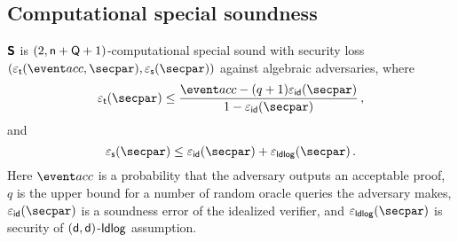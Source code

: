 \subsection{Computational special soundness}
\begin{lemma}
	\label{lem:sonicprot_ss}
	$\bm{\mathsf{S}}$ is $(2, \mathsf{n} + \mathsf{Q} + 1)$-computational special sound with security loss $(\epst (\accProb, \secpar), \epss(\secpar))$ against
	algebraic adversaries, where
  \[
    \epst(\secpar) \leq \frac{\accProb - (q + 1) \epsid (\secpar)}{1 - \epsid (\secpar)}\,,
  \]
  and
	\[
	  \epss(\secpar) \leq \epsid(\secpar) + \epsldlog(\secpar) \,.
	\]
	Here $\accProb$ is a probability that the adversary outputs an acceptable proof, $q$ is the upper bound for a number of random oracle queries the adversary makes, $\epsid(\secpar)$ is a soundness error of the idealized verifier, and $\epsldlog(\secpar)$ is security of $(\mathsf{d}, \mathsf{d})$-$\mathsf{ldlog}$ assumption.
\end{lemma}
